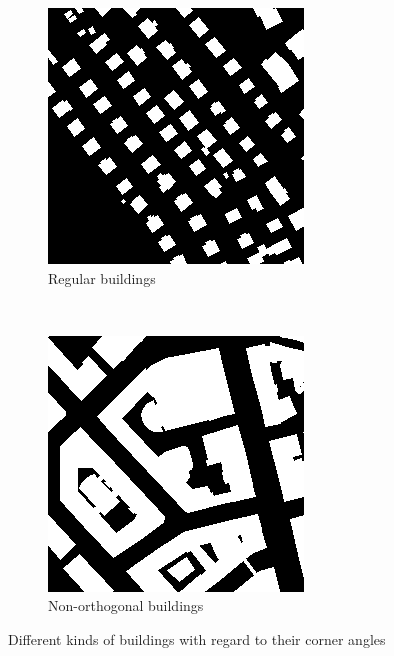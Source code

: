 \begin{figure}[H]
    \centering
	\begin{subfigure}{0.4\textwidth}
    	\includegraphics[width=0.9\linewidth]{chapters/challenges/images/regular_building_masks.png}		    \caption{Regular buildings}
    	\label{fig:challenges:regular_buildings}
	\end{subfigure}~
	\begin{subfigure}{0.4\textwidth}
    	\includegraphics[width=0.9\linewidth]{chapters/challenges/images/irregular_building_masks.png}       	\caption{Non-orthogonal buildings}
    	\label{fig:challenges:irregular_buildings}
	\end{subfigure}
	\caption{Different kinds of buildings with regard to their corner angles}
	\label{fig:challenges:building_masks}
\end{figure}

